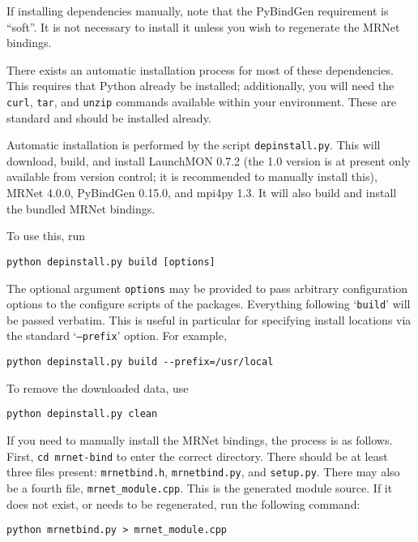 \documentclass{refart}
\begin{document}
If installing dependencies manually, note that the PyBindGen requirement is ``soft''. It is not necessary to install it unless you wish to regenerate the MRNet bindings.

There exists an automatic installation process for most of these dependencies. This requires that Python already be installed; additionally, you will need the \texttt{curl}, \texttt{tar}, and \texttt{unzip} commands available within your environment. These are standard and should be installed already.

Automatic installation is performed by the script \texttt{depinstall.py}. This will download, build, and install LaunchMON 0.7.2 (the 1.0 version is at present only available from version control; it is recommended to manually install this), MRNet 4.0.0, PyBindGen 0.15.0, and mpi4py 1.3. It will also build and install the bundled MRNet bindings.

To use this, run

\begin{Verbatim}
python depinstall.py build [options]
\end{Verbatim}

The optional argument \texttt{options} may be provided to pass arbitrary configuration options to the configure scripts of the packages. Everything following `\texttt{build}' will be passed verbatim. This is useful in particular for specifying install locations via the standard `\texttt{--prefix}' option. For example,

\begin{Verbatim}
python depinstall.py build --prefix=/usr/local
\end{Verbatim}

To remove the downloaded data, use

\begin{Verbatim}
python depinstall.py clean
\end{Verbatim}

If you need to manually install the MRNet bindings, the process is as follows. First, \texttt{cd mrnet-bind} to enter the correct directory. There should be at least three files present: \texttt{mrnetbind.h}, \texttt{mrnetbind.py}, and \texttt{setup.py}. There may also be a fourth file, \texttt{mrnet\_module.cpp}. This is the generated module source. If it does not exist, or needs to be regenerated, run the following command:

\begin{Verbatim}
python mrnetbind.py > mrnet_module.cpp
\end{Verbatim}
\end{document}
